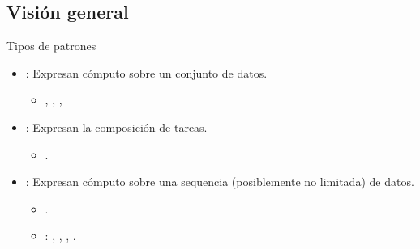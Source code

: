 \subsection{Visión general}

\begin{frame}[t]{Tipos de patrones}
\begin{itemize}
  \item {}: Expresan cómputo sobre un conjunto de datos.
    \begin{itemize}
      \item {}, , , 
    \end{itemize}
  \vfill\pause
  \item {}: Expresan la composición de tareas.
    \begin{itemize}
      \item {}.
    \end{itemize}
  \vfill\pause
  \item {}: Expresan cómputo sobre una sequencia (posiblemente no limitada) 
        de datos.
    \begin{itemize}
      \item {}.
      \item {}: , , ,
            .
    \end{itemize}
\end{itemize}
\end{frame}
